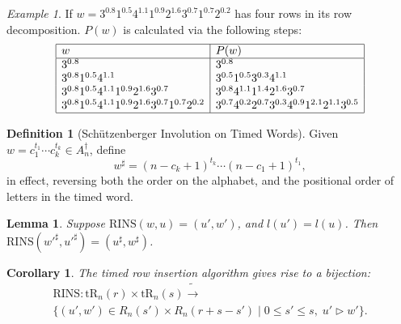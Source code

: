 \documentclass[10pt]{amsproc}
\newtheorem{lemma}[theorem]{Lemma}
\newtheorem{corollary}[theorem]{Corollary}
\theoremstyle{definition}
\newtheorem{definition}[theorem]{Definition}
\theoremstyle{remark}
\newtheorem{example}[theorem]{Example}
\newcommand{\rowins}{\mathrm{RINS}}
\newcommand{\tr}{\mathrm{tR}}
\begin{document}
\begin{example}
  If $w=3^{0.8}1^{0.5}4^{1.1}1^{0.9}2^{1.6}3^{0.7}1^{0.7}2^{0.2}$ has four rows in its row decomposition.
  $P(w)$ is calculated via the following steps:
  \begin{displaymath}
    \begin{array}{|l|l|}
      \hline
      w & P(w)\\
      \hline
      3^{0.8} & 3^{0.8}\\
      3^{0.8}1^{0.5}4^{1.1} & 3^{0.5}1^{0.5}3^{0.3}4^{1.1}\\
      3^{0.8}1^{0.5}4^{1.1}1^{0.9}2^{1.6}3^{0.7} & 3^{0.8}4^{1.1}1^{1.4}2^{1.6}3^{0.7}\\
      3^{0.8}1^{0.5}4^{1.1}1^{0.9}2^{1.6}3^{0.7}1^{0.7}2^{0.2} & 3^{0.7}4^{0.2}2^{0.7}3^{0.3}4^{0.9}1^{2.1}2^{1.1}3^{0.5}\\
      \hline
    \end{array}
  \end{displaymath}
\end{example}
\begin{definition}
  [Sch\"utzenberger Involution on Timed Words]
  \label{definition:schuetzenberger-involution}
  Given $w=c_1^{t_1}\dotsb c_k^{t_k}\in A_n^\dagger$, define
  \begin{equation}
    \label{eq:sharp}
    w^\sharp = (n-c_k+1)^{t_k} \dotsb (n-c_1+1)^{t_1},
  \end{equation}
  in effect, reversing both the order on the alphabet, and the positional order of letters in the timed word.
\end{definition}
\begin{lemma}
  \label{lemma:reverse-row-insertion}
  Suppose $\rowins(w,u)=(u',w')$, and $l(u')=l(u)$.
  Then $\rowins({w'}^\sharp,{u'}^\sharp)=(u^\sharp,w^\sharp)$.
\end{lemma}
\begin{corollary}
  \label{corollary:row-insertion-bijection}
  The timed row insertion algorithm gives rise to a bijection:
  \begin{multline*}
    \rowins: \tr_n(r)\times \tr_n(s) \tilde\to \\\{(u',w')\in R_n(s')\times R_n(r+s-s')\mid 0\leq s'\leq s,\; u'\rhd w'\}. 
  \end{multline*}
\end{corollary}
\end{document}

